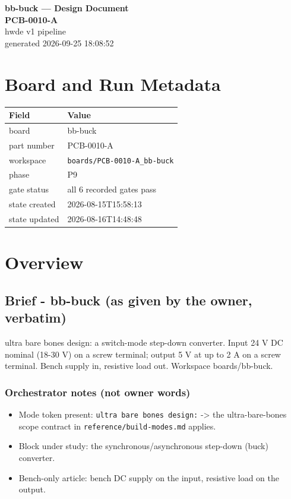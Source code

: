 \documentclass[11pt,a4paper]{article}
\begin{document}
\sloppy
\begin{center}
{\LARGE\bfseries bb-buck --- Design Document}\\[6pt]
{\Large\bfseries PCB-0010-A}\\[6pt]
{\large hwde v1 pipeline}\\[2pt]
generated 2026-09-25 18:08:52
\end{center}
\tableofcontents

\section{Board and Run Metadata}
{\small
\begin{longtable}{lp{11cm}}
\toprule
\textbf{Field} & \textbf{Value} \\
\midrule
\endhead
board & bb-buck \\
part number & PCB-0010-A \\
workspace & \texttt{boards/PCB-0010-A\_bb-buck} \\
phase & P9 \\
gate status & all 6 recorded gates pass \\
state created & 2026-08-15T15:58:13 \\
state updated & 2026-08-16T14:48:48 \\
\bottomrule
\end{longtable}
}
\section{Overview}
\subsection*{Brief - bb-buck (as given by the owner, verbatim)}
ultra bare bones design: a switch-mode step-down converter. Input 24 V DC nominal (18-30 V) on a screw terminal; output 5 V at up to 2 A on a screw terminal. Bench supply in, resistive load out. Workspace boards/bb-buck.

\subsubsection*{Orchestrator notes (not owner words)}
\begin{itemize}
\item Mode token present: \texttt{ultra bare bones design:} -\textgreater{} the ultra-bare-bones scope
contract in \texttt{reference/build-modes.md} applies.
\item Block under study: the synchronous/asynchronous step-down (buck) converter.
\item Bench-only article: bench DC supply on the input, resistive load on the output.
\end{itemize}
\end{document}
